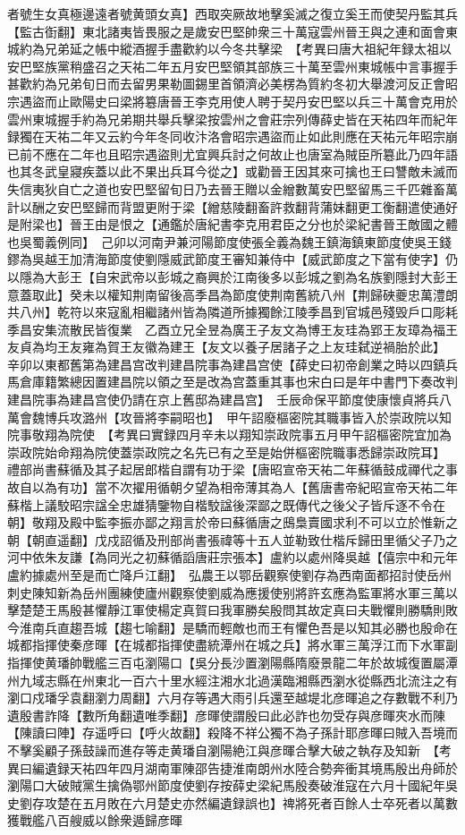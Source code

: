 者號生女真極邊遠者號黄頭女真】西取突厥故地擊奚滅之復立奚王而使契丹監其兵【監古衘翻】東北諸夷皆畏服之是歲安巴堅帥衆三十萬寇雲州晉王與之連和面會東城約為兄弟延之帳中縱酒握手盡歡約以今冬共擊梁　【考異曰唐大祖紀年録太祖以安巴堅族黨稍盛召之天祐二年五月安巴堅領其部族三十萬至雲州東城帳中言事握手甚歡約為兄弟旬日而去留男果勒圖錫里首領濟必美楞為質約冬初大舉渡河反正會昭宗遇盜而止歐陽史曰梁將簒唐晉王李克用使人聘于契丹安巴堅以兵三十萬會克用於雲州東城握手約為兄弟期共舉兵擊梁按雲州之會莊宗列傳薛史皆在天祐四年而紀年録獨在天祐二年又云約今年冬同收汴洛會昭宗遇盜而止如此則應在天祐元年昭宗崩已前不應在二年也且昭宗遇盜則尤宜興兵討之何故止也唐室為賊臣所簒此乃四年語也其冬武皇寢疾蓋以此不果出兵耳今從之】或勸晉王因其來可擒也王曰讐敵未滅而失信夷狄自亡之道也安巴堅留旬日乃去晉王贈以金繒數萬安巴堅留馬三千匹雜畜萬計以酬之安巴堅歸而背盟更附于梁【繒慈陵翻畜許救翻背蒲妹翻更工衡翻遣使通好是附梁也】晉王由是恨之【通鑑於唐紀書李克用君臣之分也於梁紀書晉王敵國之體也吳蜀義例同】　己卯以河南尹兼河陽節度使張全義為魏王鎮海鎮東節度使吳王錢鏐為吳越王加清海節度使劉隱威武節度王審知兼侍中【威武節度之下當有使字】仍以隱為大彭王【自宋武帝以彭城之裔興於江南後多以彭城之劉為名族劉隱封大彭王意蓋取此】癸未以權知荆南留後高季昌為節度使荆南舊統八州【荆歸硤夔忠萬澧朗共八州】乾符以來寇亂相繼諸州皆為隣道所據獨餘江陵季昌到官城邑殘毁戶口彫耗季昌安集流散民皆復業　乙酉立兄全昱為廣王子友文為博王友珪為郢王友璋為福王友貞為均王友雍為賀王友徽為建王【友文以養子居諸子之上友珪弑逆禍胎於此】　辛卯以東都舊第為建昌宫改判建昌院事為建昌宫使【薛史曰初帝創業之時以四鎮兵馬倉庫籍繁總因置建昌院以領之至是改為宫蓋重其事也宋白曰是年中書門下奏改判建昌院事為建昌宫使仍請在京上舊邸為建昌宫】　壬辰命保平節度使康懷貞將兵八萬會魏博兵攻潞州【攻晉將李嗣昭也】　甲午詔廢樞密院其職事皆入於崇政院以知院事敬翔為院使　【考異曰實録四月辛未以翔知崇政院事五月甲午詔樞密院宜加為崇政院始命翔為院使蓋崇政院之名先已有之至是始併樞密院職事悉歸崇政院耳】　禮部尚書蘇循及其子起居郎楷自謂有功于梁【唐昭宣帝天祐二年蘇循鼓成禪代之事故自以為有功】當不次擢用循朝夕望為相帝薄其為人【舊唐書帝紀昭宣帝天祐二年蘇楷上議駮昭宗諡全忠雄猜鑒物自楷駮諡後深鄙之既傳代之後父子皆斥逐不令在朝】敬翔及殿中監李振亦鄙之翔言於帝曰蘇循唐之䲭梟賣國求利不可以立於惟新之朝【朝直遥翻】戊戍詔循及刑部尚書張禕等十五人並勒致仕楷斥歸田里循父子乃之河中依朱友謙【為同光之初蘇循謟唐莊宗張本】盧約以處州降吳越【僖宗中和元年盧約據處州至是而亡降戶江翻】　弘農王以鄂岳觀察使劉存為西南面都招討使岳州刺史陳知新為岳州團練使廬州觀察使劉威為應援使别將許玄應為監軍將水軍三萬以擊楚楚王馬殷甚懼靜江軍使楊定真賀曰我軍勝矣殷問其故定真曰夫戰懼則勝驕則敗今淮南兵直趨吾城【趨七喻翻】是驕而輕敵也而王有懼色吾是以知其必勝也殷命在城都指揮使秦彦暉【在城都指揮使盡統潭州在城之兵】將水軍三萬浮江而下水軍副指揮使黄璠帥戰艦三百屯瀏陽口【吳分長沙置瀏陽縣隋廢景龍二年於故城復置屬潭州九域志縣在州東北一百六十里水經注湘水北過漢臨湘縣西瀏水從縣西北流注之有瀏口戍璠孚袁翻瀏力周翻】六月存等遇大雨引兵還至越堤北彦暉追之存數戰不利乃遺殷書詐降【數所角翻遺唯季翻】彦暉使謂殷曰此必詐也勿受存與彦暉夾水而陳【陳讀曰陣】存遥呼曰【呼火故翻】殺降不祥公獨不為子孫計耶彦暉曰賊入吾境而不擊奚顧子孫鼓譟而進存等走黄璠自瀏陽絶江與彦暉合擊大破之執存及知新　【考異曰編遺録天祐四年四月湖南軍陳邵告捷淮南朗州水陸合勢奔衝其境馬殷出舟師於瀏陽口大破賊黨生擒偽鄂州節度使劉存按薛史梁紀馬殷奏破淮寇在六月十國紀年吳史劉存攻楚在五月敗在六月楚史亦然編遺録誤也】禆將死者百餘人士卒死者以萬數獲戰艦八百艘威以餘衆遁歸彦暉
